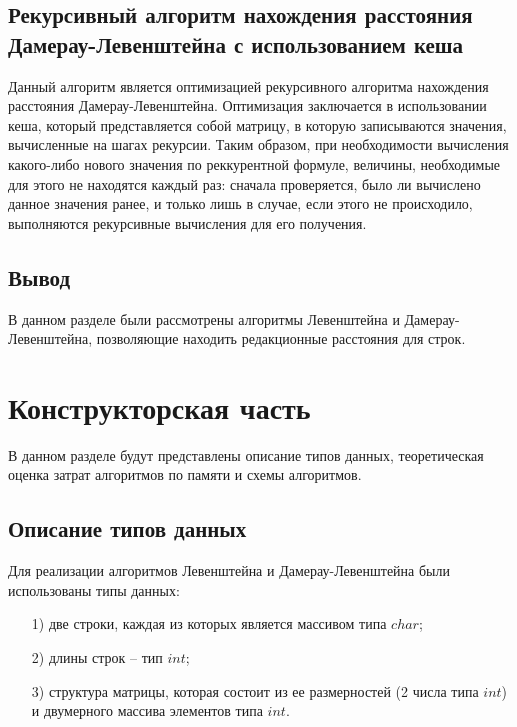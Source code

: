 \documentclass[12pt]{report}
\begin{document}
	\section{Рекурсивный алгоритм нахождения расстояния Дамерау-Левенштейна с использованием кеша}
	Данный алгоритм является оптимизацией рекурсивного алгоритма нахождения расстояния Дамерау-Левенштейна. Оптимизация заключается в использовании кеша, который представляется собой матрицу, в которую записываются значения, вычисленные на шагах рекурсии. Таким образом, при необходимости вычисления какого-либо нового значения по реккурентной формуле, величины, необходимые для этого не находятся каждый раз: сначала проверяется, было ли вычислено данное значения ранее, и только лишь в случае, если этого не происходило, выполняются рекурсивные вычисления для его получения.
	
	
	\section*{Вывод}
	
	В данном разделе были рассмотрены алгоритмы Левенштейна и Дамерау-Левенштейна, позволяющие находить редакционные расстояния для строк.
	
	\clearpage
	
	\chapter{Конструкторская часть}
	
	В данном разделе будут представлены описание типов данных, теоретическая оценка затрат алгоритмов по памяти и схемы алгоритмов. 
	
	\section{Описание типов данных}
	
	Для реализации алгоритмов Левенштейна и Дамерау-Левенштейна были использованы типы данных:

	\begin{enumerate}
	\item[1)] две строки, каждая из которых является массивом типа $char$;
	\item[2)] длины строк -- тип $int$;
	\item[3)] структура матрицы, которая состоит из ее размерностей (2 числа типа $int$) и двумерного массива элементов типа $int$.
	\end{enumerate}
	
\end{document}
